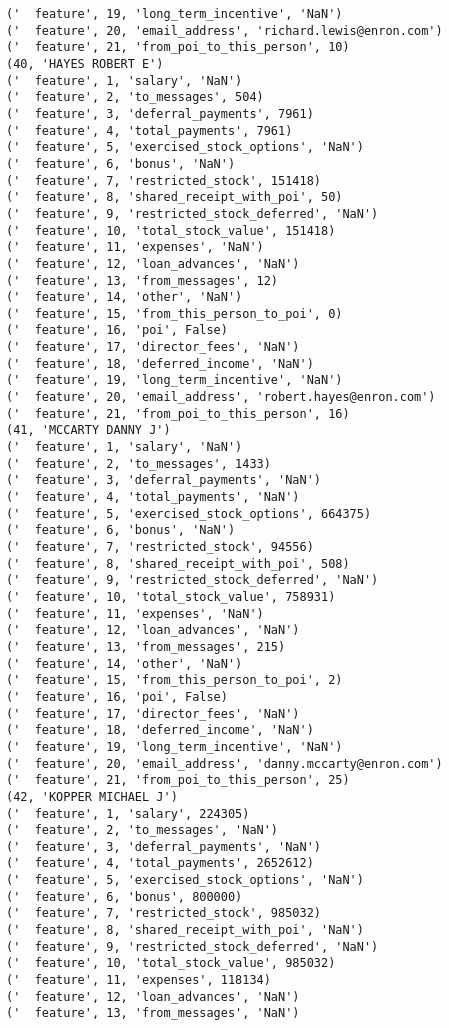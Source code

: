 \begin{verbatim}
('  feature', 19, 'long_term_incentive', 'NaN')
('  feature', 20, 'email_address', 'richard.lewis@enron.com')
('  feature', 21, 'from_poi_to_this_person', 10)
(40, 'HAYES ROBERT E')
('  feature', 1, 'salary', 'NaN')
('  feature', 2, 'to_messages', 504)
('  feature', 3, 'deferral_payments', 7961)
('  feature', 4, 'total_payments', 7961)
('  feature', 5, 'exercised_stock_options', 'NaN')
('  feature', 6, 'bonus', 'NaN')
('  feature', 7, 'restricted_stock', 151418)
('  feature', 8, 'shared_receipt_with_poi', 50)
('  feature', 9, 'restricted_stock_deferred', 'NaN')
('  feature', 10, 'total_stock_value', 151418)
('  feature', 11, 'expenses', 'NaN')
('  feature', 12, 'loan_advances', 'NaN')
('  feature', 13, 'from_messages', 12)
('  feature', 14, 'other', 'NaN')
('  feature', 15, 'from_this_person_to_poi', 0)
('  feature', 16, 'poi', False)
('  feature', 17, 'director_fees', 'NaN')
('  feature', 18, 'deferred_income', 'NaN')
('  feature', 19, 'long_term_incentive', 'NaN')
('  feature', 20, 'email_address', 'robert.hayes@enron.com')
('  feature', 21, 'from_poi_to_this_person', 16)
(41, 'MCCARTY DANNY J')
('  feature', 1, 'salary', 'NaN')
('  feature', 2, 'to_messages', 1433)
('  feature', 3, 'deferral_payments', 'NaN')
('  feature', 4, 'total_payments', 'NaN')
('  feature', 5, 'exercised_stock_options', 664375)
('  feature', 6, 'bonus', 'NaN')
('  feature', 7, 'restricted_stock', 94556)
('  feature', 8, 'shared_receipt_with_poi', 508)
('  feature', 9, 'restricted_stock_deferred', 'NaN')
('  feature', 10, 'total_stock_value', 758931)
('  feature', 11, 'expenses', 'NaN')
('  feature', 12, 'loan_advances', 'NaN')
('  feature', 13, 'from_messages', 215)
('  feature', 14, 'other', 'NaN')
('  feature', 15, 'from_this_person_to_poi', 2)
('  feature', 16, 'poi', False)
('  feature', 17, 'director_fees', 'NaN')
('  feature', 18, 'deferred_income', 'NaN')
('  feature', 19, 'long_term_incentive', 'NaN')
('  feature', 20, 'email_address', 'danny.mccarty@enron.com')
('  feature', 21, 'from_poi_to_this_person', 25)
(42, 'KOPPER MICHAEL J')
('  feature', 1, 'salary', 224305)
('  feature', 2, 'to_messages', 'NaN')
('  feature', 3, 'deferral_payments', 'NaN')
('  feature', 4, 'total_payments', 2652612)
('  feature', 5, 'exercised_stock_options', 'NaN')
('  feature', 6, 'bonus', 800000)
('  feature', 7, 'restricted_stock', 985032)
('  feature', 8, 'shared_receipt_with_poi', 'NaN')
('  feature', 9, 'restricted_stock_deferred', 'NaN')
('  feature', 10, 'total_stock_value', 985032)
('  feature', 11, 'expenses', 118134)
('  feature', 12, 'loan_advances', 'NaN')
('  feature', 13, 'from_messages', 'NaN')

\end{verbatim}
